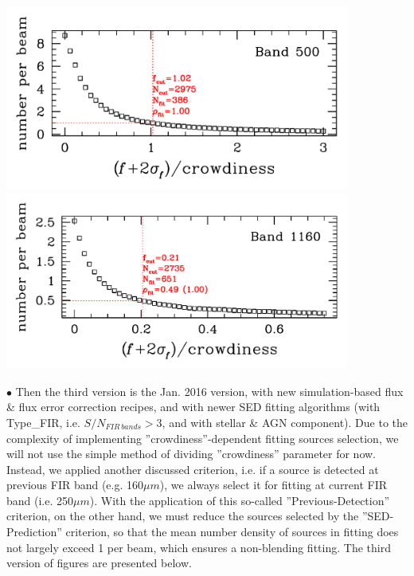 \documentclass[11pt,a4paper]{article}
\begin{document}
\begin{center}
	\includegraphics[width=0.85\textwidth]{galsed_plot_cutting_flux_500_with_crow_201512} \\
	\includegraphics[width=0.85\textwidth]{galsed_plot_cutting_flux_1160_with_crow_201512} \\
\end{center}

\indent\hspace{15pt}$\bullet$ 
Then the third version is the Jan. 2016 version, with new simulation-based flux \& flux error correction recipes, and with newer SED fitting algorithms (with Type\_FIR, i.e. $S/N_{FIR\,bands}>3$, and with stellar \& AGN component). Due to the complexity of implementing ''crowdiness''-dependent fitting sources selection, we will not use the simple method of dividing ''crowdiness'' parameter for now. Instead, we applied another discussed criterion, i.e. if a source is detected at previous FIR band (e.g. 160${\mu}m$), we always select it for fitting at current FIR band (i.e. 250${\mu}m$). With the application of this so-called ''Previous-Detection'' criterion, on the other hand, we must reduce the sources selected by the ''SED-Prediction'' criterion, so that the mean number density of sources in fitting does not largely exceed 1 per beam, which ensures a non-blending fitting. The third version of figures are presented below. 
\end{document}

